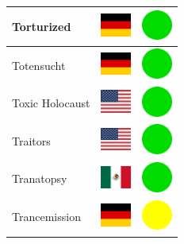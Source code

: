 \documentclass[12pt, a4paper, twoside]{report}
\begin{document}
\begin{center}
\begin{longtable}{|p{5cm}|p{2cm}|p{2cm}|}
 Torturized                                                 & \includegraphics[width=1cm]{4x3/de} &   \includegraphics[width=1cm]{likes/y} \\ \hline
 Totensucht                                                 & \includegraphics[width=1cm]{4x3/de} &   \includegraphics[width=1cm]{likes/y} \\ \hline
 Toxic Holocaust                                            & \includegraphics[width=1cm]{4x3/us} &   \includegraphics[width=1cm]{likes/y} \\ \hline
 Traitors                                                   & \includegraphics[width=1cm]{4x3/us} &   \includegraphics[width=1cm]{likes/y} \\ \hline
 Tranatopsy                                                 & \includegraphics[width=1cm]{4x3/mx} &   \includegraphics[width=1cm]{likes/y} \\ \hline
 Trancemission                                              & \includegraphics[width=1cm]{4x3/de} &   \includegraphics[width=1cm]{likes/m} \\ \hline

\end{longtable}
\end{center}
\end{document}
